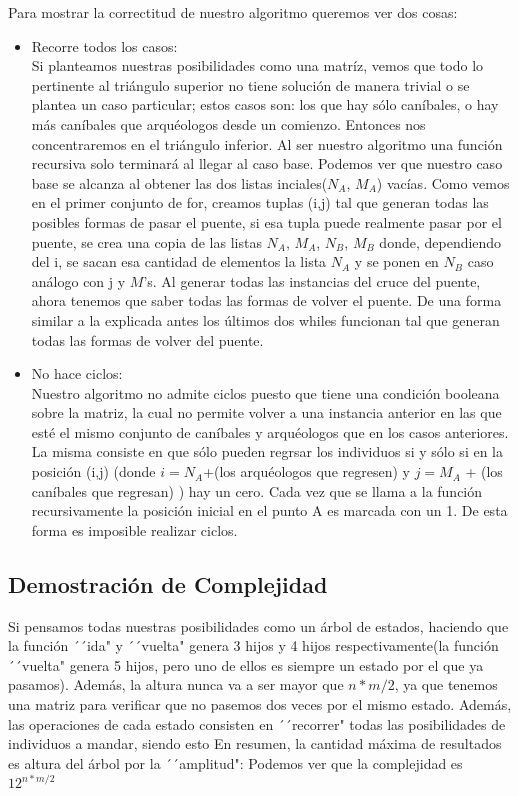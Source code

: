 \documentclass[spanish,12pt]{article}
\begin{document}
Para mostrar la correctitud de nuestro algoritmo queremos ver dos cosas:
\begin{itemize}

	\item Recorre todos los casos: \\
Si planteamos nuestras posibilidades como una matríz, vemos que todo lo pertinente al triángulo superior no tiene solución de manera trivial o se plantea un caso particular; estos casos son: los que hay sólo caníbales, o hay más caníbales que arquéologos desde un comienzo. Entonces nos concentraremos en el triángulo inferior.
Al ser nuestro algoritmo una función recursiva solo terminará al llegar al caso base. Podemos ver que nuestro caso base se alcanza al obtener las dos listas inciales($N_A$, $M_A$) vacías.
Como vemos en el primer conjunto de for, creamos  tuplas (i,j) tal que generan todas las posibles formas de pasar el puente, si esa tupla puede realmente pasar por el puente, se crea una copia de las listas $N_A$, $M_A$, $N_B$, $M_B$ donde, dependiendo del i, se sacan esa cantidad de elementos la lista $N_A$ y se ponen en $N_B$ caso análogo con j y $M$'s.
Al generar todas las instancias del cruce del puente, ahora tenemos que saber todas las formas de volver el puente. De una forma similar a la explicada antes los últimos dos whiles funcionan tal que generan todas las formas de volver del puente.

	\item No hace ciclos: \\
Nuestro algoritmo no admite ciclos puesto que tiene una condición booleana sobre la matriz, la cual no permite volver a una instancia anterior en las que esté el mismo conjunto de caníbales y arquéologos que en los casos anteriores. La misma consiste en que sólo pueden regrsar los individuos si y sólo si en la posición (i,j) (donde $i= N_A$+(los arquéologos que regresen) y $j=M_A$ + (los caníbales que regresan) ) hay un cero. Cada vez que se llama a la función recursivamente la posición inicial en el punto A es marcada con un 1. De esta forma es imposible realizar ciclos.

\end{itemize}




\subsection{Demostración de Complejidad}
	Si pensamos todas nuestras posibilidades como un árbol de estados, haciendo que la función ´´ida" y ´´vuelta" genera 3 hijos y 4 hijos respectivamente(la función ´´vuelta" genera 5 hijos, pero uno de ellos es siempre un estado por el que ya pasamos).
	 Además, la altura nunca va a ser mayor que $n*m/2$, ya que tenemos una matriz para verificar que no pasemos dos veces por el mismo estado. Además, las operaciones de cada estado consisten en ´´recorrer" todas las posibilidades de individuos a mandar, siendo esto %
	 En resumen, la cantidad máxima de resultados es altura del árbol por la ´´amplitud": Podemos ver que la complejidad es $12^{n*m/2}$
\end{document}
